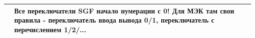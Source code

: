 \pagestyle{fancy}
\fancyhf{}
\renewcommand{\headrulewidth}{1pt}
\rfoot{{\thepage}}
\renewcommand{\footrulewidth}{1pt}


\pagecolor{yellow!5}

\begin{flushleft}

\color{black}
\footnotesize

\vskip 3mm


\setlength{\extrarowheight}{0.3cm} %

\begin{longtable}{|>{\centering\arraybackslash}m{1cm}|>{\raggedright\arraybackslash}m{15cm}|}
    \hline
    \rowcolor{green!25} %
    \centering 1 & \raggedright\arraybackslash Все переключатели SGF начало нумерации с 0! Для МЭК там свои правила - переключатель ввода вывода 0/1, переключатель с перечислением 1/2/...\\
    \hline
\end{longtable}


\end{flushleft}